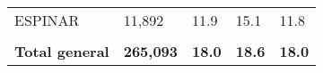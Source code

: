 \begin{tabular}{lllll}
	\cellcolor[HTML]{FF5050}ESPINAR                                & 11,892                                                                & 11.9                                                                             & 15.1                                                                        & 11.8                                                                                \\
	&                                                                       &                                                                                  &                                                                             &                                                                                     \\
	\rowcolor[HTML]{DDEBF7} 
	\textbf{Total   general}                                       & \textbf{265,093}                                                      & \textbf{18.0}                                                                    & \textbf{18.6}                                                               & \textbf{18.0}                                                                      
\end{tabular}
